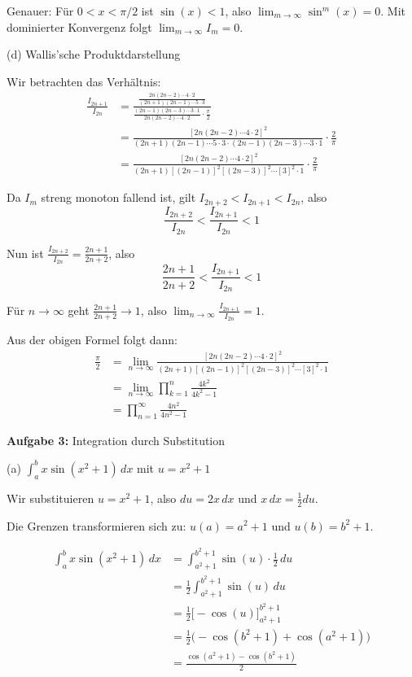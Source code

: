 \documentclass{article}
\begin{document}
Genauer: Für $0 < x < \pi/2$ ist $\sin(x) < 1$, also $\lim_{m \to \infty} \sin^m(x) = 0$.
Mit dominierter Konvergenz folgt $\lim_{m \to \infty} I_m = 0$.

(d) Wallis'sche Produktdarstellung

Wir betrachten das Verhältnis:
\begin{align}
\frac{I_{2n+1}}{I_{2n}} &= \frac{\frac{2n(2n-2)\cdots 4 \cdot 2}{(2n+1)(2n-1)\cdots 5 \cdot 3}}{\frac{(2n-1)(2n-3)\cdots 3 \cdot 1}{2n(2n-2)\cdots 4 \cdot 2} \cdot \frac{\pi}{2}} \\
&= \frac{[2n(2n-2)\cdots 4 \cdot 2]^2}{(2n+1)(2n-1)\cdots 5 \cdot 3 \cdot (2n-1)(2n-3)\cdots 3 \cdot 1} \cdot \frac{2}{\pi} \\
&= \frac{[2n(2n-2)\cdots 4 \cdot 2]^2}{(2n+1)[(2n-1)]^2[(2n-3)]^2\cdots [3]^2 \cdot 1} \cdot \frac{2}{\pi}
\end{align}

Da $I_m$ streng monoton fallend ist, gilt $I_{2n+2} < I_{2n+1} < I_{2n}$, also
$$\frac{I_{2n+2}}{I_{2n}} < \frac{I_{2n+1}}{I_{2n}} < 1$$

Nun ist $\frac{I_{2n+2}}{I_{2n}} = \frac{2n+1}{2n+2}$, also
$$\frac{2n+1}{2n+2} < \frac{I_{2n+1}}{I_{2n}} < 1$$

Für $n \to \infty$ geht $\frac{2n+1}{2n+2} \to 1$, also $\lim_{n \to \infty} \frac{I_{2n+1}}{I_{2n}} = 1$.

Aus der obigen Formel folgt dann:
\begin{align}
\frac{\pi}{2} &= \lim_{n \to \infty} \frac{[2n(2n-2)\cdots 4 \cdot 2]^2}{(2n+1)[(2n-1)]^2[(2n-3)]^2\cdots [3]^2 \cdot 1} \\
&= \lim_{n \to \infty} \prod_{k=1}^n \frac{4k^2}{4k^2-1} \\
&= \prod_{n=1}^\infty \frac{4n^2}{4n^2-1}
\end{align}

\textbf{Aufgabe 3:} Integration durch Substitution

(a) $\int_a^b x\sin(x^2+1)\,dx$ mit $u = x^2 + 1$

Wir substituieren $u = x^2 + 1$, also $du = 2x\,dx$ und $x\,dx = \frac{1}{2}du$.

Die Grenzen transformieren sich zu: $u(a) = a^2 + 1$ und $u(b) = b^2 + 1$.

\begin{align}
\int_a^b x\sin(x^2+1)\,dx &= \int_{a^2+1}^{b^2+1} \sin(u) \cdot \frac{1}{2}\,du \\
&= \frac{1}{2}\int_{a^2+1}^{b^2+1} \sin(u)\,du \\
&= \frac{1}{2}\Big[-\cos(u)\Big]_{a^2+1}^{b^2+1} \\
&= \frac{1}{2}\Big(-\cos(b^2+1) + \cos(a^2+1)\Big) \\
&= \frac{\cos(a^2+1) - \cos(b^2+1)}{2}
\end{align}
\end{document}
